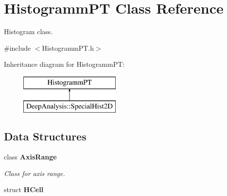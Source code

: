 \section{Histogramm\-P\-T Class Reference}
\label{classHistogrammPT}


Histogram class.  




{\ttfamily \#include $<$Histogramm\-P\-T.\-h$>$}

Inheritance diagram for Histogramm\-P\-T\-:\begin{figure}[H]
\begin{center}
\leavevmode
\includegraphics[height=2.000000cm]{classHistogrammPT}
\end{center}
\end{figure}
\subsection*{Data Structures}
\begin{DoxyCompactItemize}
\item 
class {\bf Axis\-Range}
\begin{DoxyCompactList}\small\item\em Class for axis range. \end{DoxyCompactList}\item 
struct {\bf H\-Cell}
\end{DoxyCompactItemize}
